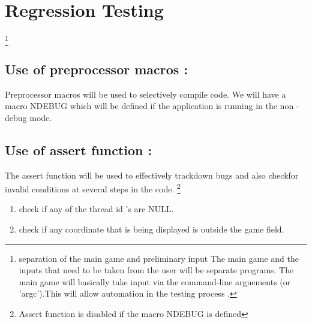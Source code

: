 \section{Regression Testing}
\footnote{separation of the main game and preliminary input
The main game and the inputs that need to be taken from the user will be separate programs. The main game will basically take input via the command-line arguements (or 'argc').This will allow automation in the testing process .}

\subsection{Use of preprocessor macros :}
Preprocessor macros will be used to selectively compile code.
  We will have a macro NDEBUG which will be defined if the application is
  running in the non - debug mode.
  \subsection{Use of assert function :}
The assert function will be used to effectively trackdown bugs and also checkfor invalid conditions at several steps in the code. 
    \footnote{  Assert function is disabled if the macro NDEBUG is defined}
\begin{enumerate}
\item{ check if any of the thread id 's are NULL.}
\item{check if any coordinate that is being displayed is outside the game field.}
\end{enumerate}
